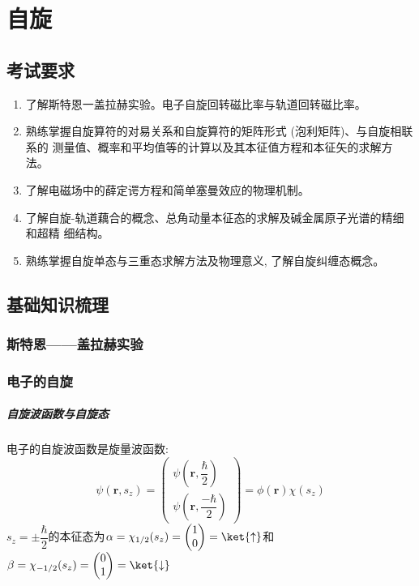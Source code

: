 \chapter{自旋}
\section{考试要求}
\begin{enumerate}
    \item 了解斯特恩一盖拉赫实验。电子自旋回转磁比率与轨道回转磁比率。
    \item 熟练掌握自旋算符的对易关系和自旋算符的矩阵形式 (泡利矩阵)、与自旋相联系的 测量值、概率和平均值等的计算以及其本征值方程和本征矢的求解方法。
    \item 了解电磁场中的薛定谔方程和简单塞曼效应的物理机制。
    \item 了解自旋-轨道藕合的概念、总角动量本征态的求解及碱金属原子光谱的精细和超精 细结构。
    \item 熟练掌握自旋单态与三重态求解方法及物理意义, 了解自旋纠缠态概念。
\end{enumerate}
\section{基础知识梳理}
\subsection{斯特恩——盖拉赫实验}
\subsection{电子的自旋}
\paragraph*{自旋波函数与自旋态}
电子的自旋波函数是旋量波函数:$$\psi(\mathbf{r},s_z)=
\begin{pmatrix}
    \psi\left(\mathbf{r},\dfrac{\hbar}{2}\right)  \\
    \psi\left(\mathbf{r},\dfrac{-\hbar}{2}\right) 
\end{pmatrix}=\phi(\mathbf{r})\chi(s_z)
    $$
    $s_z=\pm \dfrac{\hbar}{2}$的本征态为$\alpha=\chi_{1/2}(s_z)=\begin{pmatrix}
        1\\
        0
    \end{pmatrix}=\ket{\uparrow}$和$\beta=\chi_{-1/2}(s_z)=\begin{pmatrix}
        0\\
        1
    \end{pmatrix}=\ket{\downarrow}$

